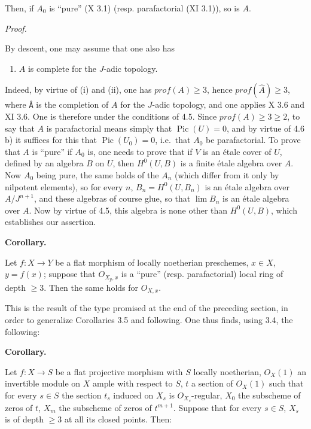 \documentclass[
  11pt,
  a4paper,
]{book}
\newcounter{none} %
\providecommand{\tightlist}{%
  \setlength{\itemsep}{0pt}\setlength{\parskip}{0pt}}
\begin{document}
Then, if \(A_{0}\) is ``pure'' (X 3.1) (resp. parafactorial (XI 3.1)),
so is \(A\).

\emph{Proof.}

By descent, one may assume that one also has

\begin{enumerate}
\def\labelenumi{\arabic{enumi}.}
\tightlist
\item
  \(A\) is complete for the \(J\)-adic topology.
\end{enumerate}

Indeed, by virtue of (i) and (ii), one has \(prof(A) \geqslant 3\),
hence \(prof(\hat{A}) \geqslant 3\), where \texttt{Â} is the completion
of \(A\) for the \(J\)-adic topology, and one applies X 3.6 and XI 3.6.
One is therefore under the conditions of 4.5. Since
\(prof(A) \geqslant 3 \geqslant 2\), to say that \(A\) is parafactorial
means simply that \(\operatorname{Pic}(U)
= 0\), and by virtue of 4.6 b) it suffices for this that
\(\operatorname{Pic}(U_{0}) = 0\), i.e.~that \(A_{0}\) be parafactorial.
To prove that \(A\) is ``pure'' if \(A_{0}\) is, one needs to prove that
if \(V\) is an étale cover of \(U\), defined by an algebra \(B\) on
\(U\), then \(H^{0}(U, B)\) is a finite étale algebra over \(A\). Now
\(A_{0}\) being pure, the same holds of the \(A_{n}\) (which differ from
it only by nilpotent elements), so for every \(n\),
\(B_{n} = H^{0}(U, B_{n})\) is an étale algebra over \(A/J^{n+1}\), and
these algebras of course glue, so that \(\lim B_{n}\) is an étale
algebra over \(A\). Now by virtue of 4.5, this algebra is none other
than \(H^{0}(U, B)\), which establishes our assertion.

\textbf{Corollary.}

Let \(f: X \to Y\) be a flat morphism of locally noetherian preschemes,
\(x \in X\), \(y = f(x)\); suppose that \(O_{X_{y},x}\) is a ``pure''
(resp. parafactorial) local ring of depth \(\geqslant 3\). Then the same
holds for \(O_{X,x}\).

This is the result of the type promised at the end of the preceding
section, in order to generalize Corollaries 3.5 and following. One thus
finds, using 3.4, the following:

\textbf{Corollary.}

Let \(f: X \to S\) be a flat projective morphism with \(S\) locally
noetherian, \(O_{X}(1)\) an invertible module on \(X\) ample with
respect to \(S\), \(t\) a section of \(O_{X}(1)\) such that for every
\(s \in S\) the section \(t_{s}\) induced on \(X_{s}\) is
\(O_{X_{s}}\)-regular, \(X_{0}\) the subscheme of zeros of \(t\),
\(X_{m}\) the subscheme of zeros of \(t^{m+1}\). Suppose that for every
\(s \in S\), \(X_{s}\) is of depth \(\geqslant 3\) at all its closed
points. Then:
\end{document}
